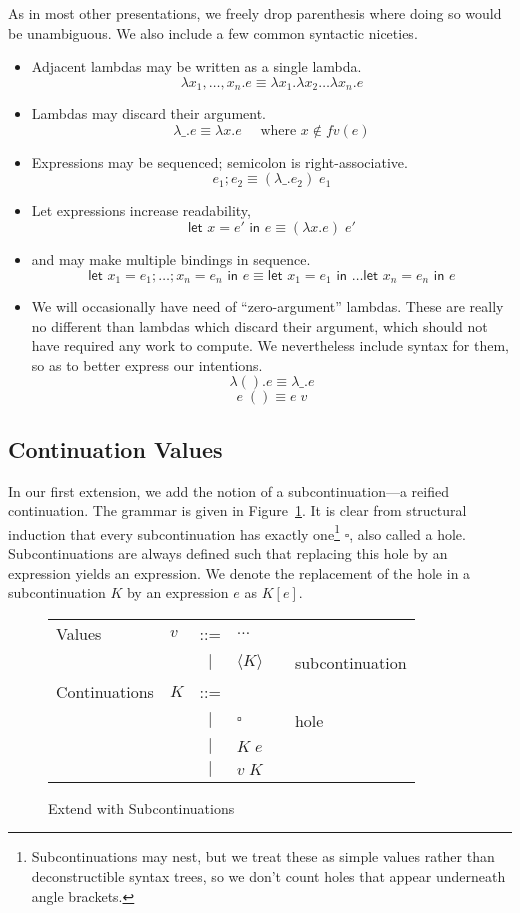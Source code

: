 \documentclass[11pt]{article}
\newcommand{\maybePage}{\null}
\newcommand\x{\lambda x}
\newcommand{\letin}[2]{\textsf{let }#1\textsf{ in }#2}
\newcommand{\angles}[1]{\langle#1\rangle}
\begin{document}
As in most other presentations, we freely drop parenthesis where doing so would be unambiguous.
We also include a few common syntactic niceties.
\begin{itemize}
\item Adjacent lambdas may be written as a single lambda.
	$$\x_1,\ldots,x_n.e \equiv \x_1.\x_2\ldots\x_n.e$$
\item Lambdas may discard their argument.
	$$\lambda\_.e \equiv \x.e \quad\textrm{ where }x \notin fv(e)$$
\item Expressions may be sequenced; semicolon is right-associative.
	$$e_1; e_2 \equiv (\lambda\_.e_2)\;e_1$$
\item Let expressions increase readability,
	$$\letin{x = e'}{e} \equiv (\x.e)\;e'$$
\item and may make multiple bindings in sequence.
	$$\letin{x_1 = e_1; \ldots; x_n = e_n}{e} \equiv \letin{x_1 = e_1}{\ldots\letin{x_n = e_n}{e}}$$
\item We will occasionally have need of ``zero-argument'' lambdas.
These are really no different than lambdas which discard their argument, which should not have required any work to compute.
We nevertheless include syntax for them, so as to better express our intentions.
	$$\lambda().e \equiv \lambda\_.e$$
	$$e\;() \equiv e\;v$$
\end{itemize}


\maybePage
\subsection{Continuation Values}

In our first extension, we add the notion of a subcontinuation---a reified continuation.
The grammar is given in Figure~\ref{fig:addSubconts}.
It is clear from structural induction that every subcontinuation has exactly one\footnote{Subcontinuations may nest, but we treat these as simple values rather than deconstructible syntax trees, so we don't count holes that appear underneath angle brackets.} $\square$, also called a hole.
Subcontinuations are always defined such that replacing this hole by an expression yields an expression.
We denote the replacement of the hole in a subcontinuation $K$ by an expression $e$ as $K[e]$.

\begin{figure}[H]
\caption{Extend with Subcontinuations}
\label{fig:addSubconts}

\begin{tabular}{llclll}
Values & $v$ & ::= & $\ldots$ \\
& & $|$ & $\angles{K}$ && subcontinuation \\
Continuations & $K$ & ::= & \\
& & $|$ & $\square$ && hole \\
& & $|$ & $K\;e$ &&  \\
& & $|$ & $v\;K$ &&  \\

\end{tabular}
\end{figure}
\end{document}
